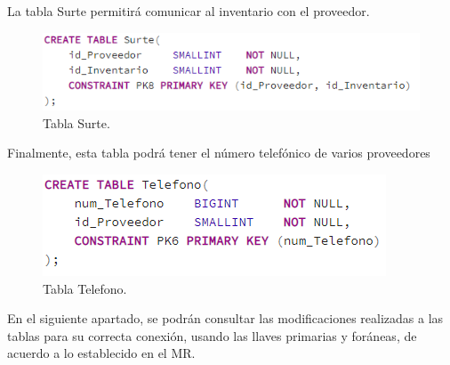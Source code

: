 \documentclass[12pt,letterpaper]{article}
\begin{document}
	La tabla Surte permitirá comunicar al inventario con el proveedor. 	
	\begin{figure}[H]
		\centering
		\includegraphics[scale=0.90]{Documentacion/img/tablaSurte.PNG}
		\caption{Tabla Surte.}
	\end{figure}
	Finalmente, esta tabla podrá tener el número telefónico de varios proveedores 	
	\begin{figure}[H]
		\centering
		\includegraphics[scale=0.90]{Documentacion/img/tablaTelefono.PNG}
		\caption{Tabla Telefono.}
	\end{figure}
	En el siguiente apartado, se podrán consultar las modificaciones realizadas a las tablas para su correcta conexión, usando las llaves primarias y foráneas, de acuerdo a lo establecido en el MR. 
	
\end{document}
